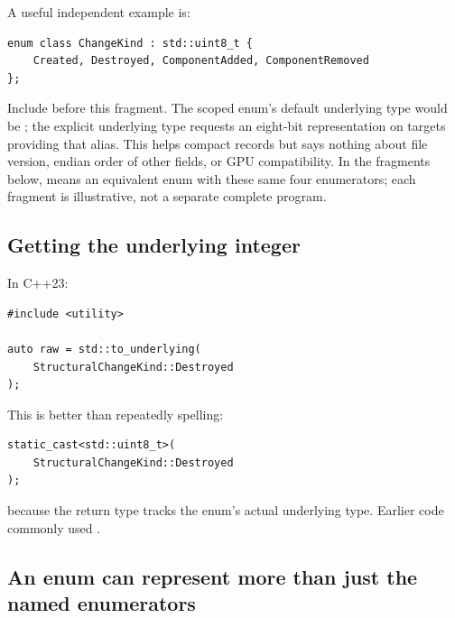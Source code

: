 A useful independent example is:

\begin{verbatim}
enum class ChangeKind : std::uint8_t {
    Created, Destroyed, ComponentAdded, ComponentRemoved
};
\end{verbatim}

Include  before this fragment. The scoped enum's default underlying type would be ; the explicit underlying type requests an eight-bit representation on targets providing that alias. This helps compact records but says nothing about file version, endian order of other fields, or GPU compatibility. In the fragments below,  means an equivalent enum with these same four enumerators; each fragment is illustrative, not a separate complete program.

\subsection{Getting the underlying integer}\label{01-foundations-i-ch002-getting-the-underlying-integer}

\hypertarget{01-foundations-i-ch002-getting-the-underlying-integer}{}

In C++23:

\begin{verbatim}
#include <utility>

auto raw = std::to_underlying(
    StructuralChangeKind::Destroyed
);
\end{verbatim}

This is better than repeatedly spelling:

\begin{verbatim}
static_cast<std::uint8_t>(
    StructuralChangeKind::Destroyed
);
\end{verbatim}

because the return type tracks the enum's actual underlying type. Earlier code commonly used .

\subsection{An enum can represent more than just the named enumerators}\label{01-foundations-i-ch002-an-enum-can-represent-more-than-just-the-named-enumerators}

